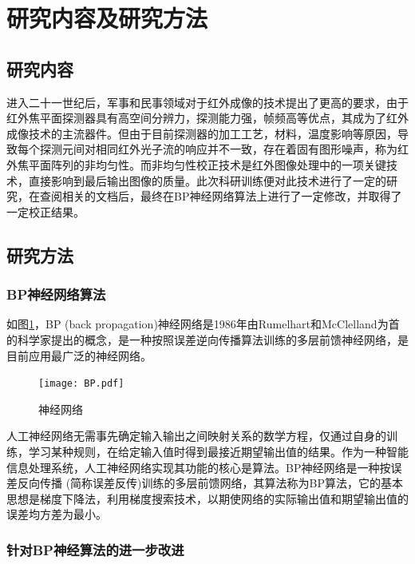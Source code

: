\documentclass{article}
\newcounter{sub}
\begin{document}
\section{研究内容及研究方法}%
\label{sec:研究内容及研究方法}

\subsection{研究内容}%
\label{sub:研究内容}

进入二十一世纪后，军事和民事领域对于红外成像的技术提出了更高的要求，由于红外焦平面探测器具有高空间分辨力，探测能力强，帧频高等优点，其成为了红外成像技术的主流器件。但由于目前探测器的加工工艺，材料，温度影响等原因，导致每个探测元间对相同红外光子流的响应并不一致，存在着固有图形噪声，称为红外焦平面阵列的非均匀性。而非均匀性校正技术是红外图像处理中的一项关键技术，直接影响到最后输出图像的质量。此次科研训练便对此技术进行了一定的研究，在查阅相关的文档后，最终在BP神经网络算法上进行了一定修改，并取得了一定校正结果。

\subsection{研究方法}%
\label{sub:研究方法}

\subsubsection{BP神经网络算法}%
\label{ssub:BP神经网络算法}

如图\ref{fig:神经网络}，BP (back propagation)神经网络是1986年由Rumelhart和McClelland为首的科学家提出的概念，是一种按照误差逆向传播算法训练的多层前馈神经网络，是目前应用最广泛的神经网络。

\begin{figure}[htpb]
	\centering
	\texttt{[image: BP.pdf]}
	\caption{神经网络}
	\label{fig:神经网络}
\end{figure}

人工神经网络无需事先确定输入输出之间映射关系的数学方程，仅通过自身的训练，学习某种规则，在给定输入值时得到最接近期望输出值的结果。作为一种智能信息处理系统，人工神经网络实现其功能的核心是算法。BP神经网络是一种按误差反向传播 (简称误差反传)训练的多层前馈网络，其算法称为BP算法，它的基本思想是梯度下降法，利用梯度搜索技术，以期使网络的实际输出值和期望输出值的误差均方差为最小。

\subsubsection{针对BP神经算法的进一步改进}%
\label{ssub:针对BP神经算法的进一步改进}
\end{document}
